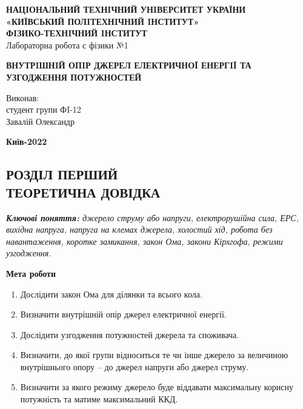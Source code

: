 \documentclass[a4paper,12pt]{article}
\begin{document}
	\begin{center}
		\hfill \break
		\large{\textbf{НАЦIОНАЛЬНИЙ ТЕХНIЧНИЙ УНIВЕРСИТЕТ УКРАЇНИ\\
			«КИЇВСЬКИЙ ПОЛIТЕХНIЧНИЙ IНСТИТУТ»\\
			ФIЗИКО-ТЕХНIЧНИЙ IНСТИТУТ}}\\
		\hfill \break \hfill \break \hfill\break \hfill \break \hfill \break \hfill \break \hfill \break
		\hfill \break \hfill \break
		\large{Лабораторна робота с фізики №1}
		\begin{center}
			\normalsize{\textbf{ВНУТРIШНIЙ ОПIР ДЖЕРЕЛ ЕЛЕКТРИЧНОЇ ЕНЕРГIЇ ТА УЗГОДЖЕННЯ ПОТУЖНОСТЕЙ}}
		\end{center}
	\end{center}
	\hfill \break \hfill \break \hfill \break \hfill \break \hfill \break \hfill \break \hfill \break
	\hfill \break \hfill \break \hfill \break \hfill \break \hfill \break \hfill \break 
	\begin{flushright}
		\large{ \hspace{35pt} Виконав:\\
		студент групи ФI-12\\
		Завалій Олександр} 
	\end{flushright}
	\hfill \break \hfill \break \hfill \break \hfill \break \hfill \break \hfill \break \hfill \break
	\hfill \break \hfill \break 
	\begin{center} \textbf{Київ-2022} \end{center}
	\thispagestyle{empty} %
	
\newpage
	\begin{center}
		\section* {РОЗДІЛ ПЕРШИЙ\\ТЕОРЕТИЧНА ДОВІДКА }
	\end{center}
	\textit{\textbf{Ключові поняття:} джерело струму або напруги, електрорушійна сила, ЕРС, вихідна напруга, напруга на клемах джерела, холостий хід, робота без навантаження, коротке замикання, закон Ома, закони Кірхгофа, режими узгодження. }
	
	\begin{center}
		\textbf{Мета роботи}
	\end{center}
	\begin{enumerate}
		\item Дослідити закон Ома для ділянки та всього кола.  
		\item Визначити внутрішній опір джерел електричної енергії.  
		\item Дослідити узгодження потужностей джерела та споживача.  
		\item Визначити, до якої групи відноситься те чи інше джерело за величиною внутрішнього опору – до джерел напруги або джерел струму.  
		\item Визначити за якого режиму джерело буде віддавати максимальну корисну потужність та матиме максимальний ККД. 
	\end{enumerate}
	
\end{document}

